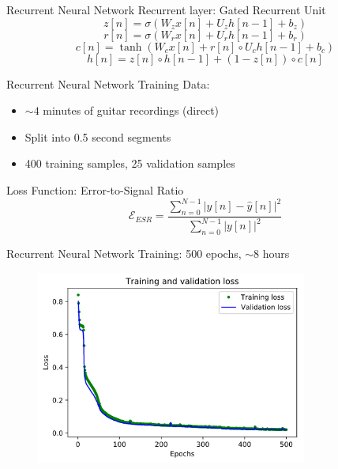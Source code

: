 \begin{frame}{Recurrent Neural Network}
    Recurrent layer: Gated Recurrent Unit
    \begin{equation}
        z[n] = \sigma(W_z x[n] + U_z h[n-1] + b_z)
    \end{equation}
    \begin{equation}
        r[n] = \sigma(W_r x[n] + U_r h[n-1] + b_r)
    \end{equation}
    \begin{equation}
        c[n] = \tanh(W_c x[n] + r[n] \circ U_c h[n-1] + b_c)
    \end{equation}
    \begin{equation}
        h[n] = z[n] \circ h[n-1] + (1 - z[n]) \circ c[n]
    \end{equation}
\end{frame}

\begin{frame}{Recurrent Neural Network}
    Training Data:
    \begin{itemize}
        \itemsep0em
        \item $\sim 4$ minutes of guitar recordings (direct)
        \item Split into 0.5 second segments
        \item 400 training samples, 25 validation samples
    \end{itemize}
    \vspace{2ex}
    Loss Function: Error-to-Signal Ratio
    \begin{equation}
        \mathcal{E}_{ESR} = \frac{\sum_{n=0}^{N-1} |y[n] - \hat{y}[n]|^2}{\sum_{n=0}^{N-1} |y[n]|^2}
    \end{equation}
\end{frame}

\begin{frame}{Recurrent Neural Network}
    Training: 500 epochs, $\sim 8$ hours
    \begin{figure}
        \centering
        \includegraphics[height=2.5in]{../Paper/Figures/Training.png}
    \end{figure}
\end{frame}

